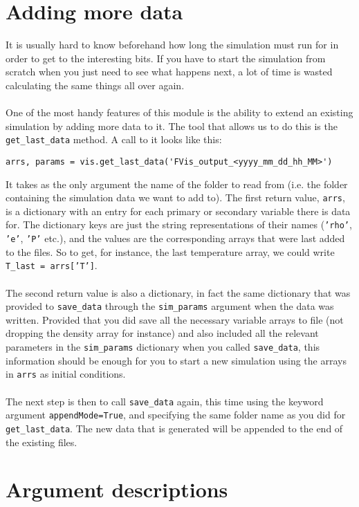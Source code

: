 \documentclass{article}
\newcommand{\ttt}[1]{\texttt{#1}}
\begin{document}
\section{Adding more data}
\label{sec:addat}
It is usually hard to know beforehand how long the simulation must run for in order to get to the interesting bits. If you have to start the simulation from scratch when you just need to see what happens next, a lot of time is wasted calculating the same things all over again.\\\\
One of the most handy features of this module is the ability to extend an existing simulation by adding more data to it. The tool that allows us to do this is the \ttt{get\_last\_data} method. A call to it looks like this:\\
\begin{lstlisting}[breaklines=false]
arrs, params = vis.get_last_data('FVis_output_<yyyy_mm_dd_hh_MM>')
\end{lstlisting}
It takes as the only argument the name of the folder to read from (i.e. the folder containing the simulation data we want to add to). The first return value, \ttt{arrs}, is a dictionary with an entry for each primary or secondary variable there is data for. The dictionary keys are just the string representations of their names (\ttt{'rho'}, \ttt{'e'}, \ttt{'P'} etc.), and the values are the corresponding arrays that were last added to the files. So to get, for instance, the last temperature array, we could write \ttt{T\_last = arrs['T']}.\\\\
The second return value is also a dictionary, in fact the same dictionary that was provided to \ttt{save\_data} through the \ttt{sim\_params} argument when the data was written. Provided that you did save all the necessary variable arrays to file (not dropping the density array for instance) and also included all the relevant parameters in the \ttt{sim\_params} dictionary when you called \ttt{save\_data}, this information should be enough for you to start a new simulation using the arrays in \ttt{arrs} as initial conditions.\\\\
The next step is then to call \ttt{save\_data} again, this time using the keyword argument \ttt{appendMode=True}, and specifying the same folder name as you did for \ttt{get\_last\_data}. The new data that is generated will be appended to the end of the existing files.

\section{Argument descriptions}
\label{sec:margs}
\end{document}
